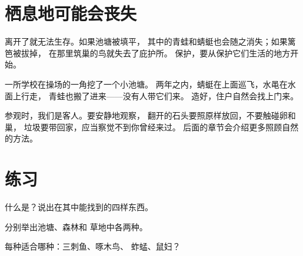 \section{栖息地可能会丧失}

\begin{proposition}\label{prop:g2:where-animals-live:loss}
离开了就无法生存。如果池塘被填平，
其中的青蛙和蜻蜓也会随之消失；如果篱笆被拔掉，
在那里筑巢的鸟就失去了庇护所。
保护，要从保护它们生活的地方开始。
\end{proposition}
\admitted

\begin{example}[学校的池塘]\label{ex:g2:where-animals-live:schoolpond}
一所学校在操场的一角挖了一个小池塘。
两年之内，蜻蜓在上面巡飞，水黾在水面上行走，
青蛙也搬了进来——没有人带它们来。
造好，住户自然会找上门来。
\end{example}

\begin{remark}[不打扰地观察]\label{rem:g2:where-animals-live:respect}
参观时，我们是客人。要安静地观察，
翻开的石头要照原样放回，不要触碰卵和巢，
垃圾要带回家，应当察觉不到你曾经来过。
后面的章节会介绍更多照顾自然的方法。
\end{remark}

\section{练习}

\begin{exercise}[$\star$]\label{exo:g2:where-animals-live:1}
什么是？说出在其中能找到的四样东西。
\end{exercise}

\begin{exercise}[$\star$]\label{exo:g2:where-animals-live:2}
分别举出池塘、森林和
草地中各两种。
\end{exercise}

\begin{exercise}[$\star$]\label{exo:g2:where-animals-live:3}
每种适合哪种：三刺鱼、啄木鸟、
蚱蜢、鼠妇？
\end{exercise}

